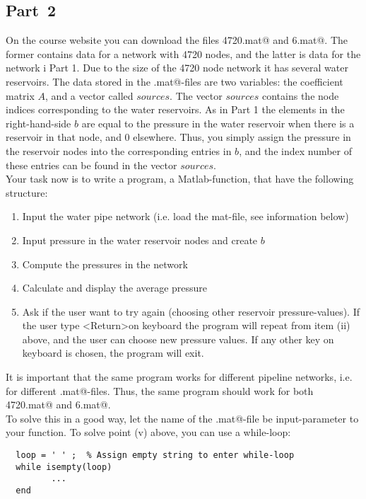 \documentclass[11pt,a4paper]{article}
\begin{document}
\subsection*{Part~2}
On the course website you can download the files \verb@water4720.mat@ and \verb@water6.mat@. The former contains data for a network with 4720 nodes, and the latter is data for the network i Part 1. Due to the size of the 4720 node network it has several water reservoirs. The data stored in the \verb@.mat@-files are two variables: the coefficient matrix $A$, and a vector called $sources$. The vector $sources$ contains the node indices corresponding to the water reservoirs. As in Part 1 the elements in the right-hand-side $b$ are equal to the pressure in the water reservoir when there is a reservoir in that node, and 0 elsewhere. Thus, you simply assign the pressure in the reservoir nodes into the corresponding entries in $b$, and the index number of these entries can be found in the vector $sources$. 
\\
Your task now is to write a program, a Matlab-function, that have the following structure:
\begin{enumerate}[label=(\roman*)]
\item Input the  water pipe network (i.e. load the mat-file, see information below)
\item Input pressure in the water reservoir nodes and create $b$
\item Compute the pressures in the network
\item Calculate and display the average pressure
\item Ask if the user want to try again (choosing other reservoir pressure-values). If the user type \textless Return\textgreater \thinspace on keyboard the program will repeat from item (ii) above,  and the user can choose new pressure values. If any other key on keyboard is chosen, the program will exit. 
\end{enumerate}
It is important that the same program works for different pipeline networks, i.e. for different \verb@.mat@-files. Thus, the same program should work for both \verb@water4720.mat@ and \verb@water6.mat@. \\
To solve this in a good way, let the name of the \verb@.mat@-file be input-parameter to your function. To solve point (v) above, you can use a while-loop:
\begin{verbatim}
  loop = ' ' ;  % Assign empty string to enter while-loop
  while isempty(loop)
         ...
  end
\end{verbatim} 
\end{document}
